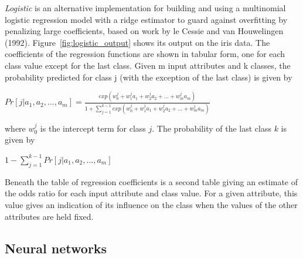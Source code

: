 \textit{Logistic} is an alternative implementation for building and
using a multinomial logistic regression model with a ridge estimator
to guard against overfitting by penalizing large coefficients, based
on work by le Cessie and van Houwelingen
(1992). Figure~\ref{fig:logistic_output} shows its output on the iris
data. The coefficients of the regression functions are shown in
tabular form, one for each class value except for the last
class. Given m input attributes and k classes, the probability
predicted for class j (with the exception of the last class) is given
by\newline

$Pr[j|a_1,a_2,...,a_m]=\frac{exp(w^j_0+w^j_1a_1+w^j_2a_2+...+w^j_ma_m)}{1 + \sum_{j=1}^{k-1}exp(w^j_0+w^j_1a_1+w^j_2a_2+...+w^j_ma_m)}$\newline

where $w^j_0$ is the intercept term for class $j$. The probability of the last class $k$ is given by\newline

$1-\sum_{j=1}^{k-1}Pr[j|a_1,a_2,...,a_m]$\newline

Beneath the table of regression coefficients is a second table giving
an estimate of the odds ratio for each input attribute and class
value. For a given attribute, this value gives an indication of its
influence on the class when the values of the other attributes are
held fixed.

\subsection{Neural networks}

